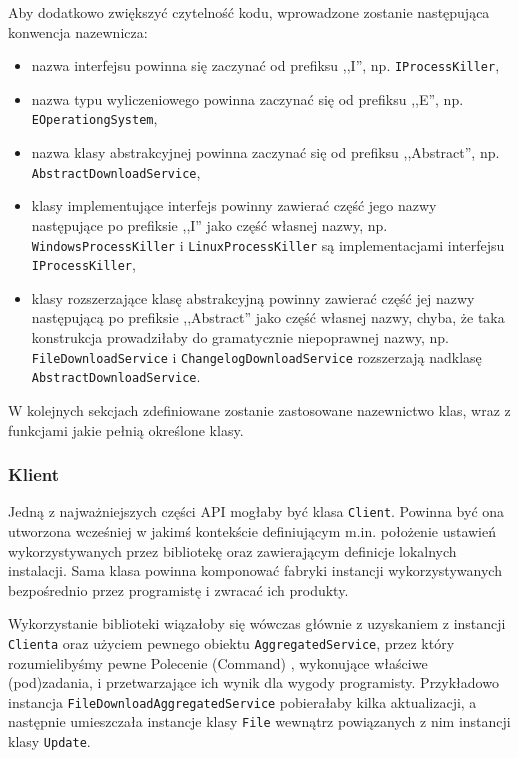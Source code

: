 \documentclass[polish,12pt,titlepage]{article}
\begin{document}
Aby dodatkowo zwiększyć czytelność kodu, wprowadzone zostanie następująca
konwencja nazewnicza:
\begin{itemize}
  \item nazwa interfejsu powinna się zaczynać od prefiksu ,,I'', np.
    \texttt{IProcessKiller},
  \item nazwa typu wyliczeniowego powinna zaczynać się od prefiksu ,,E'', np.
    \texttt{EOperationgSystem},
  \item nazwa klasy abstrakcyjnej powinna zaczynać się od prefiksu
     ,,Abstract'', np. \texttt{AbstractDownloadService},
  \item klasy implementujące interfejs powinny zawierać część jego nazwy
    następujące po prefiksie ,,I'' jako część własnej nazwy, np.
    \texttt{WindowsProcessKiller} i \texttt{LinuxProcessKiller} są
    implementacjami interfejsu \texttt{IProcessKiller},
  \item klasy rozszerzające klasę abstrakcyjną powinny zawierać część jej
    nazwy następującą po prefiksie ,,Abstract'' jako część własnej nazwy,
    chyba, że taka konstrukcja prowadziłaby do gramatycznie niepoprawnej
    nazwy, np. \texttt{FileDownloadService} i 
    \texttt{ChangelogDownloadService} rozszerzają nadklasę
    \texttt{AbstractDownloadService}.
\end{itemize}

W kolejnych sekcjach zdefiniowane zostanie zastosowane nazewnictwo klas, wraz
z funkcjami jakie pełnią określone klasy.

\subsubsection{Klient}

Jedną z najważniejszych części API mogłaby być klasa \texttt{Client}. Powinna
być ona utworzona wcześniej w jakimś kontekście definiującym m.in. położenie
ustawień wykorzystywanych przez bibliotekę oraz zawierającym definicje
lokalnych instalacji. Sama klasa powinna komponować fabryki instancji
wykorzystywanych bezpośrednio przez programistę i zwracać ich produkty.

Wykorzystanie biblioteki wiązałoby się wówczas głównie z uzyskaniem z
instancji \texttt{Clienta} oraz użyciem pewnego obiektu
\texttt{AggregatedService}, przez który rozumielibyśmy pewne Polecenie
(Command) \cite{POLECENIE}, wykonujące właściwe (pod)zadania, i przetwarzające
ich wynik dla wygody programisty. Przykładowo instancja
\texttt{FileDownloadAggregatedService} pobierałaby kilka aktualizacji, a
następnie umieszczała instancje klasy \texttt{File} wewnątrz powiązanych z nim
instancji klasy \texttt{Update}.
\end{document}
